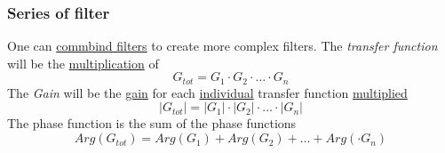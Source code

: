 \documentclass{article}
\begin{document}
\subsubsection{Series of filter}
One can \underline{commbind filters} to create more complex filters.
The \textit{transfer function} will be the \underline{multiplication} of 
\begin{equation}
    G_{tot} = G_{1}\cdot{G_2}\cdot \ldots \cdot{G_n}
\end{equation}
The \textit{Gain} will be the \underline{gain} for each \underline{individual} transfer function \underline{multiplied}
\begin{equation}
    |G_{tot}| = |G_{1}|\cdot|{G_2}|\cdot \ldots \cdot|{G_n}|
\end{equation}
The phase function is the sum of the phase functions
\begin{equation}
    Arg(G_{tot}) = Arg(G_{1})+Arg({G_2})+\ldots+Arg(\cdot{G_n})
\end{equation}


\end{document}
